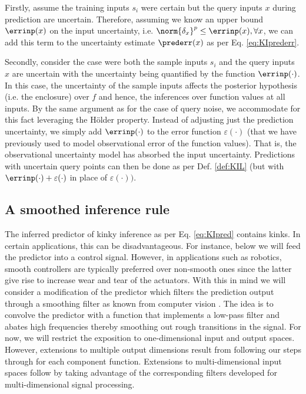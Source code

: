 Firstly, assume the training inputs $s_i$ were certain but the query inputs $x$ during prediction are uncertain.
Therefore, assuming we know an upper bound $\errinp(x)$ on the input uncertainty, i.e. 
$\norm{\delta_x}^p\leq \errinp(x), \forall x$, we can add this term to the uncertainty estimate $\prederr(x)$ as per Eq. \ref{eq:KIprederr}.

Secondly, consider the case were both the sample inputs $s_i$ and the query inputs $x$ are uncertain with the uncertainty being quantified by the function $\errinp(\cdot)$. In this case, the uncertainty of the sample inputs
 affects the posterior hypothesis (i.e. the enclosure) over $f$ and hence, the inferences over function values at all inputs. 
By the same argument as for the case of query noise, we accommodate for this fact leveraging the H\"older property. Instead of adjusting just the prediction uncertainty, we simply add $ \errinp(\cdot)$ to the error function $\varepsilon(\cdot)$ (that we have previously used to model observational 
error of the function values). That is, the observational uncertainty model has absorbed the input uncertainty.  Predictions with uncertain query points can then be done as per Def. \ref{def:KIL} (but with $ \errinp(\cdot)+ \varepsilon(\cdot)$ in place of $\varepsilon(\cdot) )$.


\subsection{A smoothed inference rule}
The inferred predictor of kinky inference as per Eq. \ref{eq:KIpred} contains kinks. In certain applications, this can be disadvantageous. For instance, below we will feed the predictor into a control signal. However, in applications such as robotics, smooth controllers are typically preferred over non-smooth ones since the latter give rise to increase wear and tear of the actuators. With this in mind we will consider a modification of the predictor which filters the prediction output through a smoothing filter as known from computer vision \cite{forsyth2002,Baessmann2004}. The idea is to convolve the predictor with a function that implements a low-pass filter and abates high frequencies thereby smoothing out rough transitions in the signal. 
For now, we will restrict the exposition to one-dimensional input and output spaces. However, extensions to multiple output dimensions result from following our steps through for each component function. Extensions to multi-dimensional input spaces follow by taking advantage of the corresponding filters developed for multi-dimensional signal processing. 

